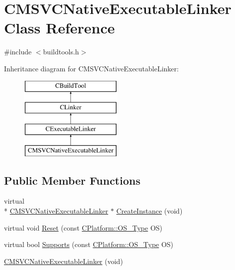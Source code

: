 \hypertarget{classCMSVCNativeExecutableLinker}{\section{C\-M\-S\-V\-C\-Native\-Executable\-Linker Class Reference}
\label{classCMSVCNativeExecutableLinker}
}


{\ttfamily \#include $<$buildtools.\-h$>$}

Inheritance diagram for C\-M\-S\-V\-C\-Native\-Executable\-Linker\-:\begin{figure}[H]
\begin{center}
\leavevmode
\includegraphics[height=4.000000cm]{d7/d52/classCMSVCNativeExecutableLinker}
\end{center}
\end{figure}
\subsection*{Public Member Functions}
\begin{DoxyCompactItemize}
\item 
virtual \\*
\hyperlink{classCMSVCNativeExecutableLinker}{C\-M\-S\-V\-C\-Native\-Executable\-Linker} $\ast$ \hyperlink{classCMSVCNativeExecutableLinker_ab769242f54c4336e1cedd340b8a45d3a}{Create\-Instance} (void)
\item 
virtual void \hyperlink{classCMSVCNativeExecutableLinker_ab3fb3e7311543adbb49e2ea4d1e1070d}{Reset} (const \hyperlink{classCPlatform_a2fb735c63c53052f79629e338bb0f535}{C\-Platform\-::\-O\-S\-\_\-\-Type} O\-S)
\item 
virtual bool \hyperlink{classCMSVCNativeExecutableLinker_a06f018ae3ec35146787b4e5970e84b58}{Supports} (const \hyperlink{classCPlatform_a2fb735c63c53052f79629e338bb0f535}{C\-Platform\-::\-O\-S\-\_\-\-Type} O\-S)
\item 
\hyperlink{classCMSVCNativeExecutableLinker_a9ebd3359407ba46e4b70742d3e106397}{C\-M\-S\-V\-C\-Native\-Executable\-Linker} (void)
\end{DoxyCompactItemize}
